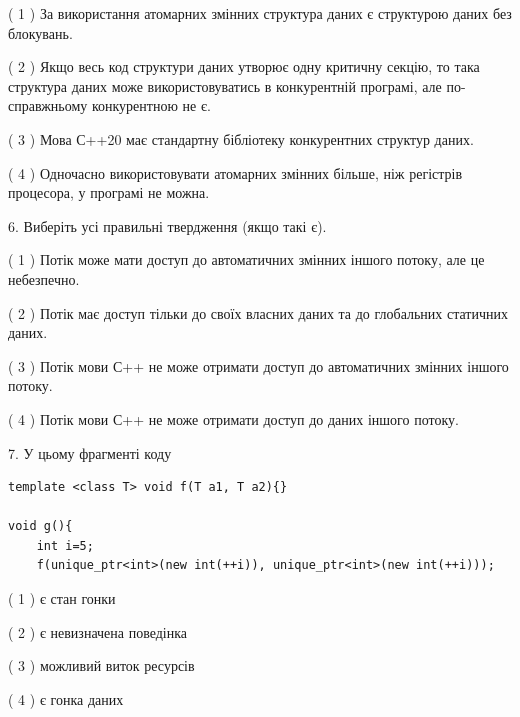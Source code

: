 \documentclass[12pt, ukrainian]{article}
\begin{document}
\begin {large}
{( 1 ) За використання атомарних змінних структура даних є структурою даних без блокувань.%

( 2 ) Якщо весь код структури даних утворює одну критичну секцію, то така структура даних може використовуватись в конкурентній програмі, але по-справжньо\-му конкурентною не є.%

( 3 ) Мова С++20 має стандартну бібліотеку конкурентних структур даних.%

( 4 ) Одночасно використовувати атомарних змінних більше, ніж регістрів процесора, у програмі не можна.%
\newpage



\vspace{5mm}
6. Виберіть усі правильні твердження (якщо такі є).\par
\vspace{2mm}

( 1 ) Потік може мати доступ до автоматичних змінних іншого потоку, але це небезпечно.%

( 2 ) Потік має доступ тільки до своїх власних даних та до глобальних статичних даних.%

( 3 ) Потік мови С++ не може отримати доступ до автоматичних змінних іншого потоку.%

( 4 ) Потік мови С++ не може отримати доступ до даних іншого потоку.%


\vspace{5mm}
7. У цьому фрагменті коду
\begin{verbatim}
template <class T> void f(T a1, T a2){}

void g(){
    int i=5;
    f(unique_ptr<int>(new int(++i)), unique_ptr<int>(new int(++i)));
\end{verbatim}

( 1 ) є стан гонки%

( 2 ) є невизначена поведінка%

( 3 ) можливий виток ресурсів%

( 4 ) є гонка даних%
}
\end {large}
\end{document}
